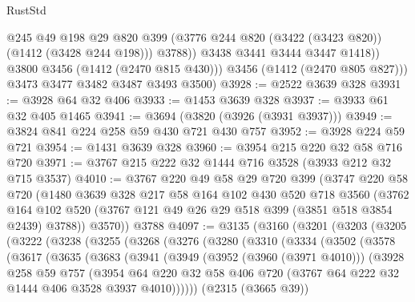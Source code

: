 \begin{lexlean}{RustStd}
\begin{coremodule}
{\begin{coremodule}
{{{{{{{{{{                  @245
                  @49
                  @198
                  @29
                  @820
                  @399
                  (@3776 @244 @820 (@3422 (@3423 @820)) (@1412 (@3428 @244 @198)))
                  @3788))
              @3438
              @3441
              @3444
              @3447
              @1418))
          @3800
          @3456
          (@1412 (@2470 @815 @430)))
        @3456
        (@1412 (@2470 @805 @827)))
      @3473
      @3477
      @3482
      @3487
      @3493
      @3500)
@3928 := @2522 @3639 @328
@3931 := @3928 @64 @32 @406
@3933 := @1453 @3639 @328
@3937 := @3933 @61 @32 @405 @1465
@3941 := @3694 (@3820 (@3926 (@3931 @3937)))
@3949 := @3824 @841 @224 @258 @59 @430 @721 @430 @757
@3952 := @3928 @224 @59 @721
@3954 := @1431 @3639 @328
@3960 := @3954 @215 @220 @32 @58 @716 @720
@3971 := @3767 @215 @222 @32 @1444 @716 @3528 (@3933 @212 @32 @715 @3537)
@4010 := @3767
    @220
    @49
    @58
    @29
    @720
    @399
    (@3747
      @220
      @58
      @720
      (@1480
        @3639
        @328
        @217
        @58
        @164
        @102
        @430
        @520
        @718
        @3560
        (@3762 @164 @102 @520 (@3767 @121 @49 @26 @29 @518 @399 (@3851 @518 @3854 @2439) @3788))
        @3570))
    @3788
@4097 := @3135
    (@3160
      (@3201
        (@3203
          (@3205
            (@3222
              (@3238
                (@3255
                  (@3268
                    (@3276
                      (@3280
                        (@3310
                          (@3334
                            (@3502
                              (@3578
                                (@3617
                                  (@3635
                                    (@3683
                                      (@3941
                                        (@3949
                                          (@3952 (@3960 (@3971 @4010)))
                                          (@3928
                                            @258
                                            @59
                                            @757
                                            (@3954
                                              @64
                                              @220
                                              @32
                                              @58
                                              @406
                                              @720
                                              (@3767 @64 @222 @32 @1444 @406 @3528 @3937 @4010))))))
                                    (@2315 (@3665 @39))
}}}}}}}}}}
\end{coremodule}}
\end{coremodule}
\end{lexlean}
